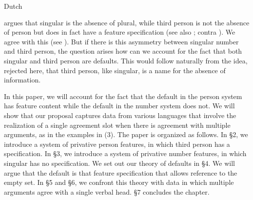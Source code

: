\documentclass[output=paper]{langsci/langscibook}
\begin{document}
\ea \label{bkm:Ref328731088}\label{bkm:Ref294426209}  Dutch
\z 
\z

\citet{Nevins2007,Nevins2011} argues that singular is the absence of plural, while third person is not the absence of person but does in fact have a feature specification (see also \citealt{Kerstens1993,Halle1997}; contra \citealt{Forchheimer1953,Kayne1993,Harley2002Person,Bejar2003,Cysouw2003,Anagnostopoulou2005Strong,Adger2007}). We agree with this (see \citealt{Ackema2013,Ackema2018}). But if there is this asymmetry between singular number and third person, the question arises how can we account for the fact that both singular and third person are defaults. This would follow naturally from the idea, rejected here, that third person, like singular, is a name for the absence of information.

In this paper, we will account for the fact that the default in the person system has feature content while the default in the number system does not. We will show that our proposal captures data from various languages that involve the realization of a single agreement slot when there is agreement with multiple arguments, as in the examples in (3). The paper is organized as follows. In §2, we introduce a system of privative person features, in which third person has a specification. In §3, we introduce a system of privative number features, in which singular has no specification. We set out our theory of defaults in §4. We will argue that the default is that feature specification that allows reference to the empty set. In §5 and §6, we confront this theory with data in which multiple arguments agree with a single verbal head. §7 concludes the chapter.
\end{document}
